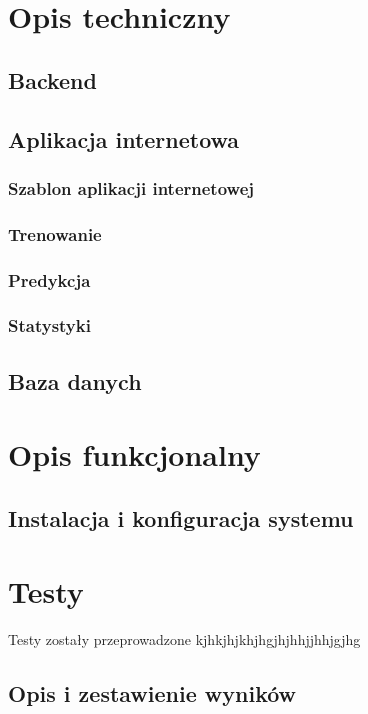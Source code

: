 \documentclass[a4paper, 11pt]{report}
\begin{document}
\chapter{Opis techniczny}

	\section{Backend}
	
	\section{Aplikacja internetowa}

		\subsection{Szablon aplikacji internetowej}
		
		\subsection{Trenowanie}
		\subsection{Predykcja}
		\subsection{Statystyki}
	
	\section{Baza danych}


\chapter{Opis funkcjonalny}

	\section{Instalacja i konfiguracja systemu}
	

\chapter{Testy}

	Testy zostały przeprowadzone kjhkjhjkhjhgjhjhhjjhhjgjhg
	
	\section{Opis i zestawienie wyników}
	
\end{document}
